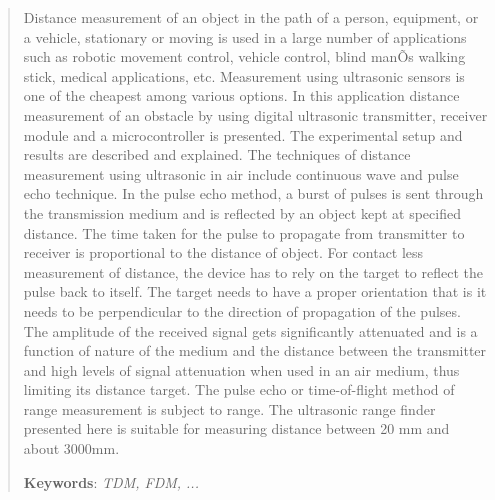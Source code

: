 \NoBgThispage
\begin{abstract}

Distance measurement of an object in the path of a person, equipment, or a vehicle, stationary or moving is used in a large number of applications such as robotic movement control, vehicle control, blind manÕs walking stick, medical applications, etc. Measurement using ultrasonic sensors is one of the cheapest among various options. In this application  distance measurement of an obstacle by using digital ultrasonic transmitter, receiver  module and a microcontroller is presented. The experimental setup and results are described and explained.
The techniques of distance measurement using ultrasonic in air include continuous wave and pulse echo technique. In the pulse echo method, a burst of pulses is sent through the transmission medium and is reflected by an object kept at specified distance. The time taken for the pulse to propagate from transmitter to receiver is proportional to the distance of object. For contact less measurement of distance, the device has to rely on the target to reflect the pulse back to itself. The target needs to have a proper orientation that is it needs to be perpendicular to the direction of propagation of the pulses. The amplitude of the received signal gets significantly attenuated and is a function of nature of the medium and the distance between the transmitter and high levels of signal attenuation when used in an air medium, thus limiting its distance target. The pulse echo or time-of-flight method of range measurement is subject to range. 
The ultrasonic range finder presented here  is suitable for measuring distance between 20 mm and about 3000mm.


{\bf Keywords}: {\it TDM, FDM, ...}

\end{abstract}

